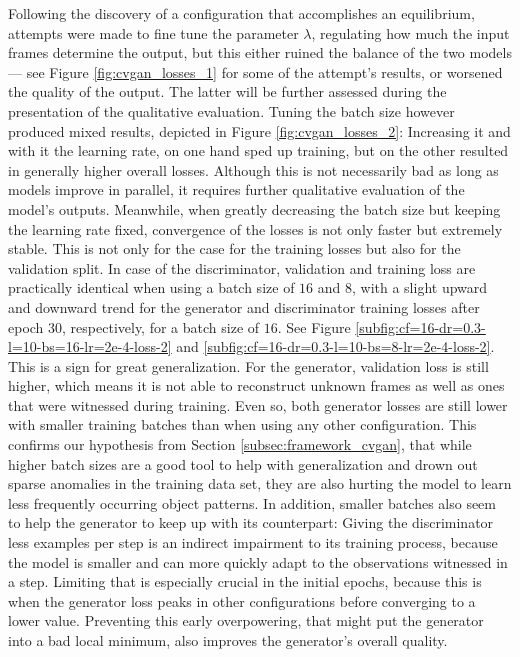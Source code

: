Following the discovery of a configuration that accomplishes an equilibrium, attempts were made to fine tune the parameter $\lambda$, regulating how much the input frames determine the output, but this either ruined the balance of the two models --- see Figure \ref{fig:cvgan_losses_1} for some of the attempt's results, or worsened the quality of the output. The latter will be further assessed during the presentation of the qualitative evaluation. Tuning the batch size however produced mixed results, depicted in Figure \ref{fig:cvgan_losses_2}: Increasing it and with it the learning rate, on one hand sped up training, but on the other resulted in generally higher overall losses. Although this is not necessarily bad as long as models improve in parallel, it requires further qualitative evaluation of the model's outputs. Meanwhile, when greatly decreasing the batch size but keeping the learning rate fixed, convergence of the losses is not only faster but extremely stable. This is not only for the case for the training losses but also for the validation split. In case of the discriminator, validation and training loss are practically identical when using a batch size of $16$ and $8$, with a slight upward and downward trend for the generator and discriminator training losses after epoch $30$, respectively, for a batch size of $16$. See Figure \ref{subfig:cf=16-dr=0.3-l=10-bs=16-lr=2e-4-loss-2} and \ref{subfig:cf=16-dr=0.3-l=10-bs=8-lr=2e-4-loss-2}. This is a sign for great generalization. For the generator, validation loss is still higher, which means it is not able to reconstruct unknown frames as well as ones that were witnessed during training. Even so, both generator losses are still lower with smaller training batches than when using any other configuration. This confirms our hypothesis from Section \ref{subsec:framework_cvgan}, that while higher batch sizes are a good tool to help with generalization and drown out sparse anomalies in the training data set, they are also hurting the model to learn less frequently occurring object patterns. In addition, smaller batches also seem to help the generator to keep up with its counterpart: Giving the discriminator less examples per step is an indirect impairment to its training process, because the model is smaller and can more quickly adapt to the observations witnessed in a step. Limiting that is especially crucial in the initial epochs, because this is when the generator loss peaks in other configurations before converging to a lower value. Preventing this early overpowering, that might put the generator into a bad local minimum, also improves the generator's overall quality.

